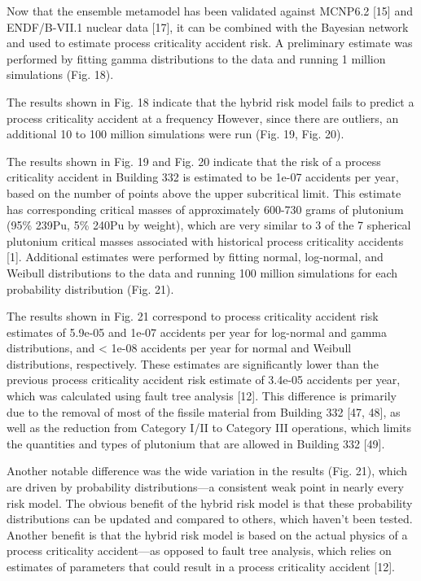 Now that the ensemble metamodel has been validated against MCNP6.2 [15] and ENDF/B-VII.1 nuclear data [17], it can be combined with the Bayesian network and used to estimate process criticality accident risk.
A preliminary estimate was performed by fitting gamma distributions to the data and running 1 million simulations (Fig. 18).

The results shown in Fig. 18 indicate that the hybrid risk model fails to predict a process criticality accident at a frequency %
However, since there are outliers, an additional 10 to 100 million simulations were run (Fig. 19, Fig. 20).

The results shown in Fig. 19 and Fig. 20 indicate that the risk of a process criticality accident in Building 332 is estimated to be 1e-07 accidents per year, based on the number of points above the upper subcritical limit.
This estimate has corresponding critical masses of approximately 600-730 grams of plutonium (95\% 239Pu, 5\% 240Pu by weight), which are very similar to 3 of the 7 spherical plutonium critical masses associated with historical process criticality accidents [1].
Additional estimates were performed by fitting normal, log-normal, and Weibull distributions to the data and running 100 million simulations for each probability distribution (Fig. 21).

The results shown in Fig. 21 correspond to process criticality accident risk estimates of 5.9e-05 and 1e-07 accidents per year for log-normal and gamma distributions, and < 1e-08 accidents per year for normal and Weibull distributions, respectively.
These estimates are significantly lower than the previous process criticality accident risk estimate of 3.4e-05 accidents per year, which was calculated using fault tree analysis [12].
This difference is primarily due to the removal of most of the fissile material from Building 332 [47, 48], as well as the reduction from Category I/II to Category III operations, which limits the quantities and types of plutonium that are allowed in Building 332 [49].

Another notable difference was the wide variation in the results (Fig. 21), which are driven by probability distributions—a consistent weak point in nearly every risk model.
The obvious benefit of the hybrid risk model is that these probability distributions can be updated and compared to others, which haven’t been tested.
Another benefit is that the hybrid risk model is based on the actual physics of a process criticality accident—as opposed to fault tree analysis, which relies on estimates of parameters that could result in a process criticality accident [12].

